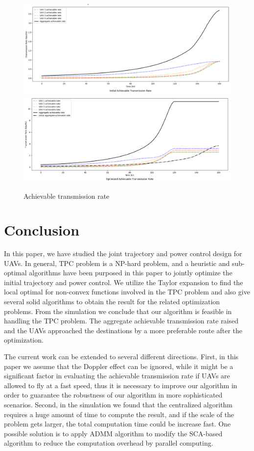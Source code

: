 \documentclass[10pt,final,conference]{IEEEtran}
\begin{document}
\begin{figure}[H]
	\includegraphics[width=\linewidth]{init_rate.png}
	\includegraphics[width=\linewidth]{opt_rate.png}
	\caption{Achievable transmission rate}
\end{figure}


\section{Conclusion}\label{VI}
In this paper, we have studied the joint trajectory and power control design for UAVs. In general, TPC problem is a NP-hard problem, and a heuristic and sub-optimal algorithms have been purposed in this paper to jointly optimize the initial trajectory and power control. We utilize the Taylor expansion to find the local optimal for non-convex functions involved in the TPC problem and also give several solid algorithms to obtain the result for the related optimization problems. From the simulation we conclude that our algorithm is feasible in handling the TPC problem. The aggregate achievable transmission rate raised and the UAVs approached the destinations by a more preferable route after the optimization. \par 
The current work can be extended to several different directions. First, in this paper we assume that the Doppler effect can be ignored, while it might be a significant factor in evaluating the achievable transmission rate if UAVs are allowed to fly at a fast speed, thus it is necessary to improve our algorithm in order to guarantee the robustness of our algorithm in more sophisticated scenarios. Second, in the simulation we found that the centralized algorithm requires a huge amount of time to compute the result, and if the scale of the problem gets larger, the total computation time could be increase fast. One possible solution is to apply ADMM algorithm to modify the SCA-based algorithm to reduce the computation overhead by parallel computing. 
\end{document}
